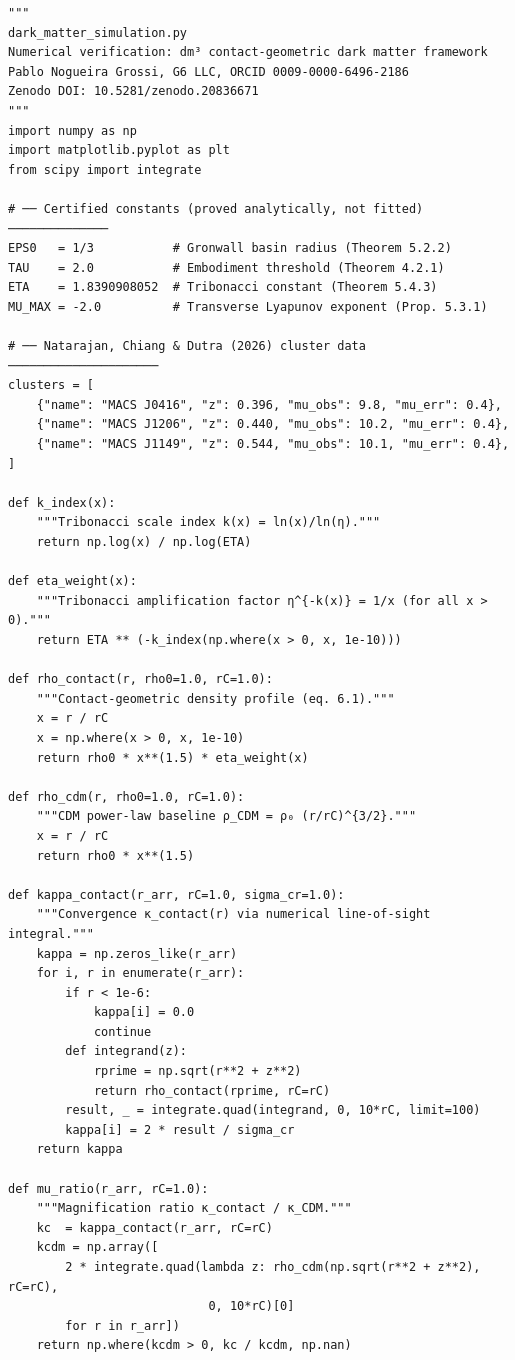 \documentclass[11pt,a4paper,openright]{book}
\theoremstyle{dm3thm}
\theoremstyle{dm3def}
\begin{document}
\begin{lstlisting}[style=pythonstyle,caption={dark\_matter\_simulation.py ---
  Numerical verification of the dm\textsuperscript{3} predictions.},
  label={lst:python}]
"""
dark_matter_simulation.py
Numerical verification: dm³ contact-geometric dark matter framework
Pablo Nogueira Grossi, G6 LLC, ORCID 0009-0000-6496-2186
Zenodo DOI: 10.5281/zenodo.20836671
"""
import numpy as np
import matplotlib.pyplot as plt
from scipy import integrate

# ── Certified constants (proved analytically, not fitted) ──────────────
EPS0   = 1/3           # Gronwall basin radius (Theorem 5.2.2)
TAU    = 2.0           # Embodiment threshold (Theorem 4.2.1)
ETA    = 1.8390908052  # Tribonacci constant (Theorem 5.4.3)
MU_MAX = -2.0          # Transverse Lyapunov exponent (Prop. 5.3.1)

# ── Natarajan, Chiang & Dutra (2026) cluster data ─────────────────────
clusters = [
    {"name": "MACS J0416", "z": 0.396, "mu_obs": 9.8, "mu_err": 0.4},
    {"name": "MACS J1206", "z": 0.440, "mu_obs": 10.2, "mu_err": 0.4},
    {"name": "MACS J1149", "z": 0.544, "mu_obs": 10.1, "mu_err": 0.4},
]

def k_index(x):
    """Tribonacci scale index k(x) = ln(x)/ln(η)."""
    return np.log(x) / np.log(ETA)

def eta_weight(x):
    """Tribonacci amplification factor η^{-k(x)} = 1/x (for all x > 0)."""
    return ETA ** (-k_index(np.where(x > 0, x, 1e-10)))

def rho_contact(r, rho0=1.0, rC=1.0):
    """Contact-geometric density profile (eq. 6.1)."""
    x = r / rC
    x = np.where(x > 0, x, 1e-10)
    return rho0 * x**(1.5) * eta_weight(x)

def rho_cdm(r, rho0=1.0, rC=1.0):
    """CDM power-law baseline ρ_CDM = ρ₀ (r/rC)^{3/2}."""
    x = r / rC
    return rho0 * x**(1.5)

def kappa_contact(r_arr, rC=1.0, sigma_cr=1.0):
    """Convergence κ_contact(r) via numerical line-of-sight integral."""
    kappa = np.zeros_like(r_arr)
    for i, r in enumerate(r_arr):
        if r < 1e-6:
            kappa[i] = 0.0
            continue
        def integrand(z):
            rprime = np.sqrt(r**2 + z**2)
            return rho_contact(rprime, rC=rC)
        result, _ = integrate.quad(integrand, 0, 10*rC, limit=100)
        kappa[i] = 2 * result / sigma_cr
    return kappa

def mu_ratio(r_arr, rC=1.0):
    """Magnification ratio κ_contact / κ_CDM."""
    kc  = kappa_contact(r_arr, rC=rC)
    kcdm = np.array([
        2 * integrate.quad(lambda z: rho_cdm(np.sqrt(r**2 + z**2), rC=rC),
                            0, 10*rC)[0]
        for r in r_arr])
    return np.where(kcdm > 0, kc / kcdm, np.nan)


\end{lstlisting}
\end{document}
